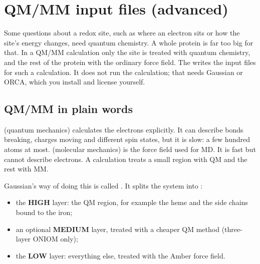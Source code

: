 \chapter{QM/MM input files (advanced)}
\label{ch:qmmm}

Some questions about a redox site, such as where an electron sits or how the
site's energy changes, need quantum chemistry. A whole protein is far too big
for that. In a QM/MM calculation only the site is treated with quantum
chemistry, and the rest of the protein with the ordinary force field. The
 writes the input files for such a
calculation. It does not run the calculation; that needs Gaussian or ORCA,
which you install and license yourself.

\begin{glance}
\end{glance}

\section{QM/MM in plain words}
\label{sec:qmmm-words}

 (quantum mechanics) calculates the electrons explicitly. It can
describe bonds breaking, charges moving and different spin states, but it is
slow: a few hundred atoms at most.  (molecular mechanics) is the
force field used for MD. It is fast but cannot describe electrons. A
 calculation treats a small region with QM and the rest with MM.

Gaussian's way of doing this is called . It splits the system into
:

\begin{itemize}
  \item the \textbf{HIGH} layer: the QM region, for example the heme and the
        side chains bound to the iron;
  \item an optional \textbf{MEDIUM} layer, treated with a cheaper QM method
        (three-layer ONIOM only);
  \item the \textbf{LOW} layer: everything else, treated with the Amber force
        field.
\end{itemize}

